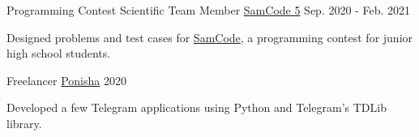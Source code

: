 \begin{cventries}
  \cventry
    {Programming Contest Scientific Team Member} %
    {\href{https://samcode.allamehelli3.ir/staff.html}{SamCode 5}} %
    {} %
    {Sep. 2020 - Feb. 2021} %
    {
      \begin{cvitems} %
        \item {Designed problems and test cases for {\href{https://samcode.allamehelli3.ir/}{SamCode}}, a programming contest for junior high school students.}
      \end{cvitems}
    }

  \cventry
    {Freelancer} %
    {\href{https://ponisha.ir/profile/radinshayanfar}{Ponisha}} %
    {} %
    {2020} %
    {
      \begin{cvitems} %
        \item {Developed a few Telegram applications using Python and Telegram’s TDLib library.}
      \end{cvitems}
    }

\end{cventries}


